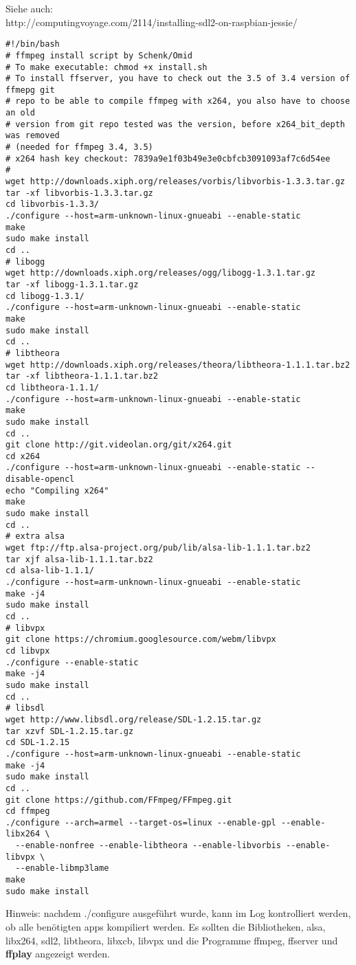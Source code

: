 Siehe auch:\\
http://computingvoyage.com/2114/installing-sdl2-on-raspbian-jessie/
\begin{verbatim}
#!/bin/bash
# ffmpeg install script by Schenk/Omid
# To make executable: chmod +x install.sh
# To install ffserver, you have to check out the 3.5 of 3.4 version of ffmepg git 
# repo to be able to compile ffmpeg with x264, you also have to choose an old 
# version from git repo tested was the version, before x264_bit_depth was removed 
# (needed for ffmpeg 3.4, 3.5)
# x264 hash key checkout: 7839a9e1f03b49e3e0cbfcb3091093af7c6d54ee
#
wget http://downloads.xiph.org/releases/vorbis/libvorbis-1.3.3.tar.gz
tar -xf libvorbis-1.3.3.tar.gz
cd libvorbis-1.3.3/
./configure --host=arm-unknown-linux-gnueabi --enable-static
make
sudo make install
cd ..
# libogg
wget http://downloads.xiph.org/releases/ogg/libogg-1.3.1.tar.gz
tar -xf libogg-1.3.1.tar.gz
cd libogg-1.3.1/
./configure --host=arm-unknown-linux-gnueabi --enable-static
make
sudo make install
cd ..
# libtheora
wget http://downloads.xiph.org/releases/theora/libtheora-1.1.1.tar.bz2
tar -xf libtheora-1.1.1.tar.bz2
cd libtheora-1.1.1/
./configure --host=arm-unknown-linux-gnueabi --enable-static
make
sudo make install
cd ..
git clone http://git.videolan.org/git/x264.git
cd x264
./configure --host=arm-unknown-linux-gnueabi --enable-static --disable-opencl
echo "Compiling x264"
make
sudo make install
cd ..
# extra alsa
wget ftp://ftp.alsa-project.org/pub/lib/alsa-lib-1.1.1.tar.bz2
tar xjf alsa-lib-1.1.1.tar.bz2
cd alsa-lib-1.1.1/
./configure --host=arm-unknown-linux-gnueabi --enable-static
make -j4
sudo make install
cd ..
# libvpx
git clone https://chromium.googlesource.com/webm/libvpx
cd libvpx
./configure --enable-static
make -j4
sudo make install
cd ..
# libsdl
wget http://www.libsdl.org/release/SDL-1.2.15.tar.gz
tar xzvf SDL-1.2.15.tar.gz
cd SDL-1.2.15
./configure --host=arm-unknown-linux-gnueabi --enable-static
make -j4
sudo make install
cd ..
git clone https://github.com/FFmpeg/FFmpeg.git
cd ffmpeg
./configure --arch=armel --target-os=linux --enable-gpl --enable-libx264 \
  --enable-nonfree --enable-libtheora --enable-libvorbis --enable-libvpx \
  --enable-libmp3lame
make
sudo make install
\end{verbatim}	
Hinweis: nachdem ./configure ausgeführt wurde, kann im Log kontrolliert werden, ob alle benötigten apps kompiliert werden. Es sollten die Bibliotheken, alsa, libx264, sdl2, libtheora, libxcb, libvpx und die Programme ffmpeg, ffserver und \textbf{ffplay} angezeigt werden.

